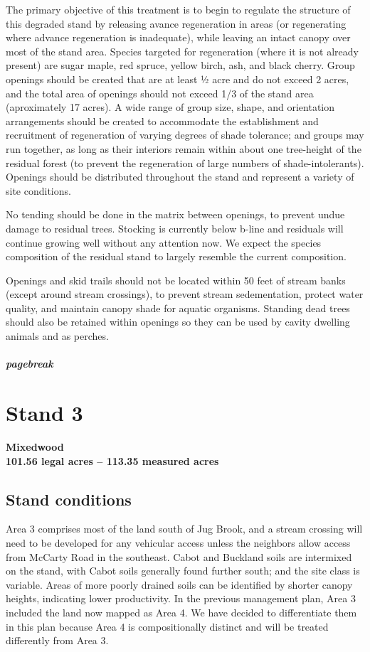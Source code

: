 \documentclass[]{tufte-handout}
\begin{document}
The primary objective of this treatment is to begin to regulate the
structure of this degraded stand by releasing avance regeneration in
areas (or regenerating where advance regeneration is inadequate), while
leaving an intact canopy over most of the stand area. Species targeted
for regeneration (where it is not already present) are sugar maple, red
spruce, yellow birch, ash, and black cherry. Group openings should be
created that are at least ½ acre and do not exceed 2 acres, and the
total area of openings should not exceed 1/3 of the stand area
(aproximately 17 acres). A wide range of group size, shape, and
orientation arrangements should be created to accommodate the
establishment and recruitment of regeneration of varying degrees of
shade tolerance; and groups may run together, as long as their interiors
remain within about one tree-height of the residual forest (to prevent
the regeneration of large numbers of shade-intolerants). Openings should
be distributed throughout the stand and represent a variety of site
conditions.

No tending should be done in the matrix between openings, to prevent
undue damage to residual trees. Stocking is currently below b-line and
residuals will continue growing well without any attention now. We
expect the species composition of the residual stand to largely resemble
the current composition.

Openings and skid trails should not be located within 50 feet of stream
banks (except around stream crossings), to prevent stream sedementation,
protect water quality, and maintain canopy shade for aquatic organisms.
Standing dead trees should also be retained within openings so they can
be used by cavity dwelling animals and as perches.

\subparagraph{pagebreak}\label{pagebreak-3}

\section{Stand 3}\label{stand-3}

\textbf{Mixedwood}\\
\textbf{101.56 legal acres -- 113.35 measured acres}

\subsection{Stand conditions}\label{stand-conditions-2}

Area 3 comprises most of the land south of Jug Brook, and a stream
crossing will need to be developed for any vehicular access unless the
neighbors allow access from McCarty Road in the southeast. Cabot and
Buckland soils are intermixed on the stand, with Cabot soils generally
found further south; and the site class is variable. Areas of more
poorly drained soils can be identified by shorter canopy heights,
indicating lower productivity. In the previous management plan, Area 3
included the land now mapped as Area 4. We have decided to differentiate
them in this plan because Area 4 is compositionally distinct and will be
treated differently from Area 3.
\end{document}
